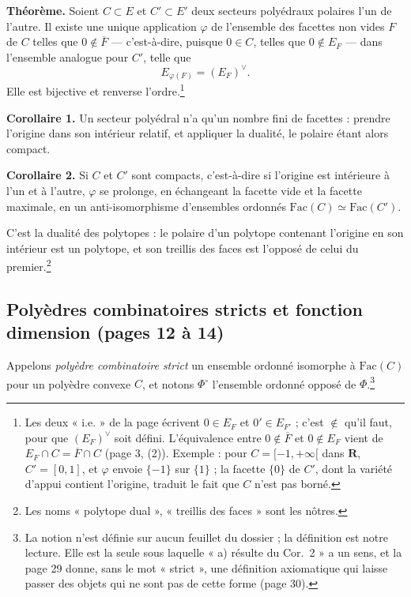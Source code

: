 \documentclass[11pt,a4paper]{article}
\begin{document}
\textbf{Théorème.} Soient $C \subset E$ et $C' \subset E'$ deux secteurs
polyédraux polaires l'un de l'autre. Il existe une unique application
$\varphi$ de l'ensemble des facettes non vides $F$ de $C$ telles que
$0 \notin \overline{F}$ --- c'est-à-dire, puisque $0 \in C$, telles que
$0 \notin E_{F}$ --- dans l'ensemble analogue pour $C'$, telle que
\[
  E_{\varphi(F)} = (E_{F})^{\vee}.
\]
Elle est bijective et renverse l'ordre.\footnote{Les deux « i.e. » de la page
écrivent $0 \in E_{F}$ et $0' \in E_{F'}$ ; c'est $\notin$ qu'il faut, pour que
$(E_{F})^{\vee}$ soit défini. L'équivalence entre $0 \notin \overline{F}$ et
$0 \notin E_{F}$ vient de $E_{F} \cap C = \overline{F} \cap C$ (page 3, (2)).
Exemple : pour $C = [-1, +\infty[$ dans $\mathbf{R}$, $C' = [0, 1]$, et
$\varphi$ envoie $\{-1\}$ sur $\{1\}$ ; la facette $\{0\}$ de $C'$, dont la
variété d'appui contient l'origine, traduit le fait que $C$ n'est pas borné.}

\textbf{Corollaire 1.} Un secteur polyédral n'a qu'un nombre fini de facettes :
prendre l'origine dans son intérieur relatif, et appliquer la dualité, le
polaire étant alors compact.

\textbf{Corollaire 2.} Si $C$ et $C'$ sont compacts, c'est-à-dire si l'origine
est intérieure à l'un et à l'autre, $\varphi$ se prolonge, en échangeant la
facette vide et la facette maximale, en un anti-isomorphisme d'ensembles
ordonnés $\mathrm{Fac}(C) \simeq \mathrm{Fac}(C')$.

C'est la dualité des polytopes : le polaire d'un polytope contenant l'origine
en son intérieur est un polytope, et son treillis des faces est l'opposé de
celui du premier.\footnote{Les noms « polytope dual », « treillis des faces »
sont les nôtres.}

\subsection*{Polyèdres combinatoires stricts et fonction dimension (pages 12 à 14)}

Appelons \emph{polyèdre combinatoire strict} un ensemble ordonné isomorphe à
$\mathrm{Fac}(C)$ pour un polyèdre convexe $C$, et notons $\Phi^{\circ}$
l'ensemble ordonné opposé de $\Phi$.\footnote{La notion n'est définie sur aucun
feuillet du dossier ; la définition est notre lecture. Elle est la seule sous
laquelle « a) résulte du Cor.~2 » a un sens, et la page 29 donne, sans le mot
« strict », une définition axiomatique qui laisse passer des objets qui ne sont
pas de cette forme (page 30).}
\end{document}
